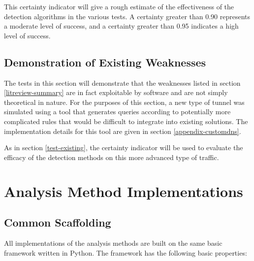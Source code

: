 \documentclass[12pt]{report}
\theoremstyle{remark}
\theoremstyle{definition}
\theoremstyle{definition}
\theoremstyle{definition}
\begin{document}
This certainty indicator will give a rough estimate of the effectiveness of the
detection algorithms in the various tests. A certainty greater than 0.90
represents a moderate level of success, and a certainty greater than 0.95
indicates a high level of success.

\subsection{Demonstration of Existing Weaknesses}
\label{test-weakness}
The tests in this section will demonstrate that the weaknesses listed in section
\ref{litreview-summary} are in fact exploitable by software and are not simply
theoretical in nature. For the purposes of this section, a new type of tunnel
was simulated using a tool that generates queries according to potentially more
complicated rules that would be difficult to integrate into existing solutions.
The implementation details for this tool are given in section
\ref{appendix-customdns}.

As in section \ref{test-existing}, the certainty indicator will be used to
evaluate the efficacy of the detection methods on this more advanced type of
traffic.

\section{Analysis Method Implementations}
\label{implementations}
\subsection{Common Scaffolding}
\label{scaffolding}
All implementations of the analysis methods are built on the same basic
framework written in Python. The framework has the following basic properties:
\end{document}
